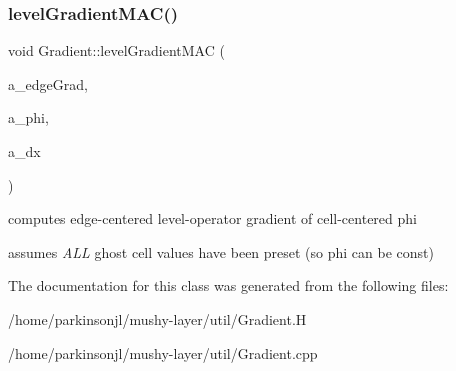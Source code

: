\subsubsection{\texorpdfstring{level\+Gradient\+M\+A\+C()}{levelGradientMAC()}\hspace{0.1cm}{\footnotesize\ttfamily [4/4]}}
{\footnotesize\ttfamily void Gradient\+::level\+Gradient\+M\+AC (\begin{DoxyParamCaption}\item[{\textbf{ Level\+Data}$<$ \textbf{ Flux\+Box} $>$ \&}]{a\+\_\+edge\+Grad,  }\item[{const \textbf{ Level\+Data}$<$ \textbf{ F\+Array\+Box} $>$ \&}]{a\+\_\+phi,  }\item[{const \textbf{ Real}}]{a\+\_\+dx }\end{DoxyParamCaption})\hspace{0.3cm}{\ttfamily [static]}}



computes edge-\/centered level-\/operator gradient of cell-\/centered phi 

assumes {\itshape A\+LL} ghost cell values have been preset (so phi can be const) 

The documentation for this class was generated from the following files\+:\begin{DoxyCompactItemize}
\item 
/home/parkinsonjl/mushy-\/layer/util/Gradient.\+H\item 
/home/parkinsonjl/mushy-\/layer/util/Gradient.\+cpp\end{DoxyCompactItemize}
